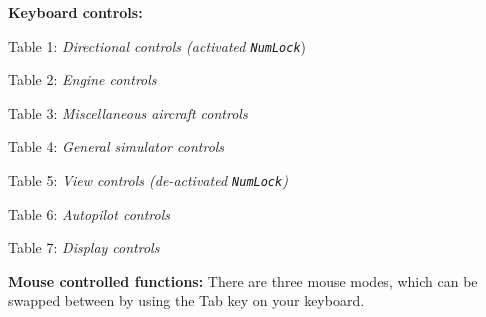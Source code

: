 \documentclass[10pt]{article}
\begin{document}
 \noindent
 \textbf{Keyboard controls:}
\begin{multicols}{2}
 \noindent
Table 1: \textit{Directional controls (activated \texttt{NumLock}})\\

\noindent

\bigskip

 \noindent
Table 2: \textit{Engine controls}
\medskip

 \noindent

\medskip

 \noindent
Table 3: \textit{Miscellaneous aircraft controls}
\medskip

 \noindent

\bigskip


 \noindent
Table 4: \textit{General simulator controls}
\medskip

 \noindent

\medskip

\noindent
Table 5: \textit{View controls (de-activated \texttt{NumLock})}
\medskip

 \noindent
 
\medskip


\medskip

 \noindent
 Table 6: \textit{Autopilot controls}
\medskip

\noindent

\medskip

 \noindent
 Table 7: \textit{Display controls}
\medskip

 \noindent

\bigskip

\end{multicols}

 \noindent
 \textbf{Mouse controlled functions:}
 There are three mouse modes, which can be swapped between by using the Tab key on your keyboard.
\end{document}
